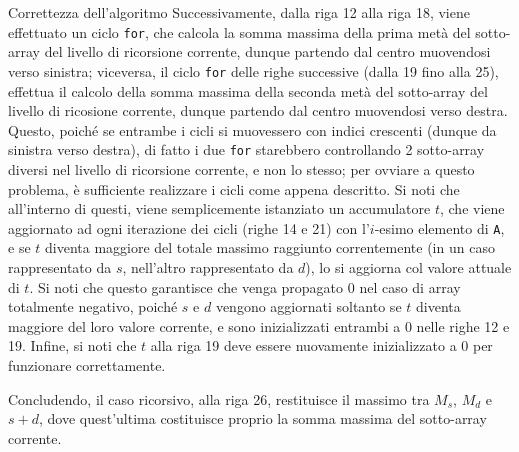 \documentclass[a4paper, 12pt]{report}
\begin{document}
\begin{framedobs}{Correttezza dell'algoritmo}
        Successivamente, dalla riga 12 alla riga 18, viene effettuato un ciclo \texttt{for}, che calcola la somma massima della prima metà del sotto-array del livello di ricorsione corrente, dunque partendo dal centro muovendosi verso sinistra; viceversa, il ciclo \texttt{for} delle righe successive (dalla 19 fino alla 25), effettua il calcolo della somma massima della seconda metà del sotto-array del livello di ricosione corrente, dunque partendo dal centro muovendosi verso destra. Questo, poiché se entrambe i cicli si muovessero con indici crescenti (dunque da sinistra verso destra), di fatto i due \texttt{for} starebbero controllando 2 sotto-array diversi nel livello di ricorsione corrente, e non lo stesso; per ovviare a questo problema, è sufficiente realizzare i cicli come appena descritto. Si noti che all'interno di questi, viene semplicemente istanziato un accumulatore $t$, che viene aggiornato ad ogni iterazione dei cicli (righe 14 e 21) con l'$i$-esimo elemento di \texttt{A}, e se $t$ diventa maggiore del totale massimo raggiunto correntemente (in un caso rappresentato da $s$, nell'altro rappresentato da $d$), lo si aggiorna col valore attuale di $t$. Si noti che questo garantisce che venga propagato 0 nel caso di array totalmente negativo, poiché $s$ e $d$ vengono aggiornati soltanto se $t$ diventa maggiore del loro valore corrente, e sono inizializzati entrambi a 0 nelle righe 12 e 19. Infine, si noti che $t$ alla riga 19 deve essere nuovamente inizializzato a 0 per funzionare correttamente.

        Concludendo, il caso ricorsivo, alla riga 26, restituisce il massimo tra $M_s$, $M_d$ e $s + d$, dove quest'ultima costituisce proprio la somma massima del sotto-array corrente.

    \end{framedobs}
\end{document}
